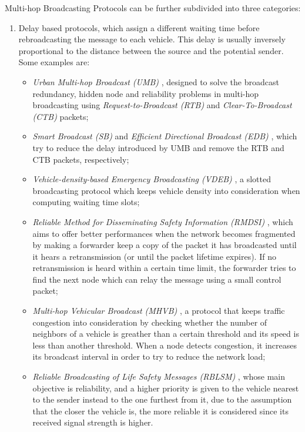 		Multi-hop Broadcasting Protocols can be further subdivided into three categories:
		\begin{enumerate}
			\item Delay based protocols, which assign a different waiting time before rebroadcasting the message to each vehicle. This delay is usually inversely proportional to the distance between the source and the potential sender.
			Some examples are:
			\begin{itemize}
				\renewcommand\labelitemi{--}
				\item \textit{Urban Multi-hop Broadcast (UMB)} \cite{Korkmaz:2004:UMB:1023875.1023887}, designed to solve the broadcast redundancy, hidden node and reliability problems in multi-hop broadcasting using \textit{Request-to-Broadcast (RTB)} and \textit{Clear-To-Broadcast (CTB)} packets; 
				\item \textit{Smart Broadcast (SB)} \cite{4025102} and \textit{Efficient Directional Broadcast (EDB)} \cite{4340158}, which try to reduce the delay introduced by UMB and remove the RTB and CTB packets, respectively;
				\item \textit{Vehicle-density-based Emergency Broadcasting (VDEB)} \cite{5663803}, a slotted broadcasting protocol which keeps vehicle density into consideration when computing waiting time slots;
				\item \textit{Reliable Method for Disseminating Safety Information
				(RMDSI)} \cite{4591259}, which aims to offer better performances when the network becomes fragmented by making a forwarder keep a copy of the packet it has broadcasted until it hears a retransmission (or until the packet lifetime expires). If no retransmission is heard within a certain time limit, the forwarder tries to find the next node which can relay the message using a small control packet;
				\item \textit{Multi-hop Vehicular Broadcast (MHVB)} \cite{4068699}, a protocol that keeps traffic congestion into consideration by   checking whether the number of neighbors of a vehicle is greather than a certain threshold and its speed is less than another threshold. When a node detects congestion, it increases its broadcast interval in order to try to reduce the network load;
				\item \textit{Reliable Broadcasting of Life Safety Messages (RBLSM)} \cite{4458046}, whose main objective is reliability, and a higher priority is given to the vehicle nearest to the sender instead to the one furthest from it, due to the assumption that the closer the vehicle is, the more reliable it is considered since its received signal strength is higher.
			\end{itemize}
		

\end{enumerate}

